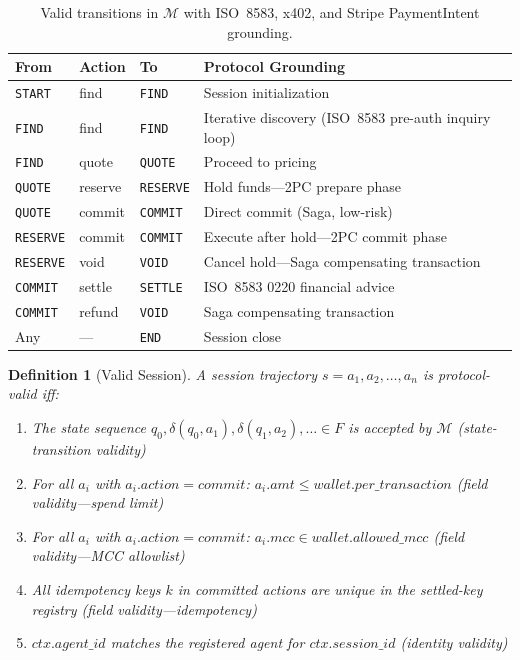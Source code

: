 \documentclass{article}
\newtheorem{definition}{Definition}
\begin{document}
\begin{table}[h]
\caption{Valid transitions in $\mathcal{M}$ with ISO~8583, x402, and Stripe PaymentIntent grounding.}
\label{tab:transitions}
\centering
\small
\begin{tabular}{llll}
\toprule
From & Action & To & Protocol Grounding \\
\midrule
\texttt{START} & find & \texttt{FIND} & Session initialization \\
\texttt{FIND} & find & \texttt{FIND} & Iterative discovery (ISO~8583 pre-auth inquiry loop) \\
\texttt{FIND} & quote & \texttt{QUOTE} & Proceed to pricing \\
\texttt{QUOTE} & reserve & \texttt{RESERVE} & Hold funds---2PC prepare phase \\
\texttt{QUOTE} & commit & \texttt{COMMIT} & Direct commit (Saga, low-risk) \\
\texttt{RESERVE} & commit & \texttt{COMMIT} & Execute after hold---2PC commit phase \\
\texttt{RESERVE} & void & \texttt{VOID} & Cancel hold---Saga compensating transaction \\
\texttt{COMMIT} & settle & \texttt{SETTLE} & ISO~8583 0220 financial advice \\
\texttt{COMMIT} & refund & \texttt{VOID} & Saga compensating transaction \\
Any & --- & \texttt{END} & Session close \\
\bottomrule
\end{tabular}
\end{table}

\begin{definition}[Valid Session]
A session trajectory $s = a_1, a_2, \ldots, a_n$ is \emph{protocol-valid} iff:
\begin{enumerate}
\item The state sequence $q_0, \delta(q_0, a_1), \delta(q_1, a_2), \ldots \in F$ is accepted by $\mathcal{M}$ (state-transition validity)
\item For all $a_i$ with $a_i.\textit{action} = \textit{commit}$: $a_i.\textit{amt} \leq \textit{wallet.per\_transaction}$ (field validity---spend limit)
\item For all $a_i$ with $a_i.\textit{action} = \textit{commit}$: $a_i.\textit{mcc} \in \textit{wallet.allowed\_mcc}$ (field validity---MCC allowlist)
\item All idempotency keys $k$ in committed actions are unique in the settled-key registry (field validity---idempotency)
\item $\textit{ctx.agent\_id}$ matches the registered agent for $\textit{ctx.session\_id}$ (identity validity)
\end{enumerate}
\end{definition}
\end{document}
